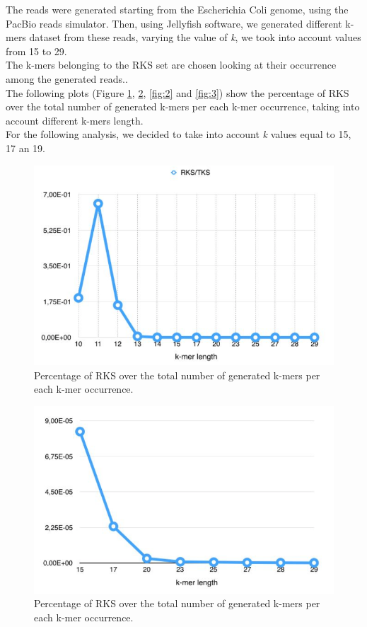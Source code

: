 \documentclass[11pt]{article}
\begin{document}
The reads were generated starting from the Escherichia Coli genome, using the PacBio reads simulator.
Then, using Jellyfish software, we generated different k-mers dataset from these reads, varying the value of \emph{k}, we took into account values from 15 to 29.\\
The k-mers belonging to the RKS set are chosen looking at their occurrence among the generated reads..\\
The following plots (Figure \ref{fig:0}, \ref{fig:1}, \ref{fig:2} and \ref{fig:3}) show the percentage of RKS over the total number of generated k-mers per each k-mer occurrence, taking into account different k-mers length.\\
For the following analysis, we decided to take into account \emph{k} values equal to 15, 17 an 19.
\begin{figure}
    \centering
    \includegraphics[scale=0.60]{image/0}
    \caption{Percentage of RKS over the total number of generated k-mers per each k-mer occurrence.}
    \label{fig:0}
\end{figure}
\begin{figure}
    \centering
    \includegraphics[scale=0.60]{image/1}
    \caption{Percentage of RKS over the total number of generated k-mers per each k-mer occurrence.}
    \label{fig:1}
\end{figure}
\end{document}
